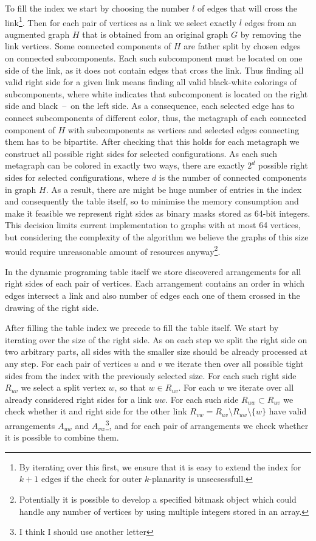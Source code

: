 To fill the index we start by choosing the number \(l\) of edges that will cross the link\footnote{By iterating over this first, we ensure that it is easy to extend the index for \(k+1\) edges if the check for outer \(k\)-planarity is unsecsessfull.}. Then for each pair of vertices as a link we select exactly \(l\) edges from an augmented graph \(H\) that is obtained from an original graph \(G\) by removing the link vertices. Some connected components of \(H\) are father split by chosen edges on connected subcomponents. Each such subcomponent must be located on one side of the link, as it does not contain edges that cross the link. Thus finding all valid right side for a given link means finding all valid black-white colorings of subcomponents, where white indicates that subcomponent is located on the right side and black~--~on the left side. As a consequence, each selected edge has to connect subcomponents of different color, thus, the metagraph of each connected component of \(H\) with subcomponents as vertices and selected edges connecting them has to be bipartite. After checking that this holds for each metagraph we construct all possible right sides for selected configurations. As each such metagraph can be colored in exactly two ways, there are exactly \(2^d\) possible right sides for selected configurations, where \(d\) is the number of connected components in graph \(H\). As a result, there are might be huge number of entries in the index and consequently the table itself, so to minimise the memory consumption and make it feasible we represent right sides as binary masks stored as 64-bit integers. This decision limits current implementation to graphs with at most 64 vertices, but considering the complexity of the algorithm we believe the graphs of this size would require unreasonable amount of resources anyway\footnote{Potentially it is possible to develop a specified bitmask object which could handle any number of vertices by using multiple integers stored in an array.}.

In the dynamic programing table itself we store discovered arrangements for all right sides of each pair of vertices. Each arrangement contains an order in which edges intersect a link and also number of edges each one of them crossed in the drawing of the right side.

After filling the table index we precede to fill the table itself. We start by iterating over the size of the right side. As on each step we split the right side on two arbitrary parts, all sides with the smaller size should be already processed at any step. For each pair of vertices \(u\) and \(v\) we iterate then over all possible tight sides from the index with the previously selected size. For each such right side \(R_{uv}\) we select a split vertex \(w\), so that \(w \in R_{uv}\). For each \(w\) we iterate over all already considered right sides for a link \(uw\). For each such side \(R_{uw} \subset R_{uv}\) we check whether it and right side for the other link \(R_{vw} = R_{uv} \setminus R_{uw} \setminus \{w\}\) have valid arrangements \(A_{uw}\) and \(A_{vw}\)\footnote{I think I should use another letter}, and for each pair of arrangements we check whether it is possible to combine them.

